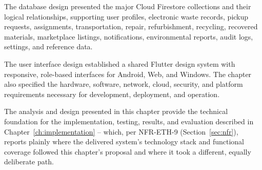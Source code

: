 The database design presented the major Cloud Firestore collections and
their logical relationships, supporting user profiles, electronic waste records,
pickup requests, assignments, transportation, repair, refurbishment, recycling,
recovered materials, marketplace listings, notifications, environmental
reports, audit logs, settings, and reference data.

The user interface design established a shared Flutter design system with
responsive, role-based interfaces for Android, Web, and Windows. The
chapter also specified the hardware, software, network, cloud, security, and
platform requirements necessary for development, deployment, and
operation.

The analysis and design presented in this chapter provide the technical
foundation for the implementation, testing, results, and evaluation described
in Chapter~\ref{ch:implementation} -- which, per NFR-ETH-9
(Section~\ref{sec:nfr}), reports plainly where the delivered system's
technology stack and functional coverage followed this chapter's proposal and
where it took a different, equally deliberate path.
